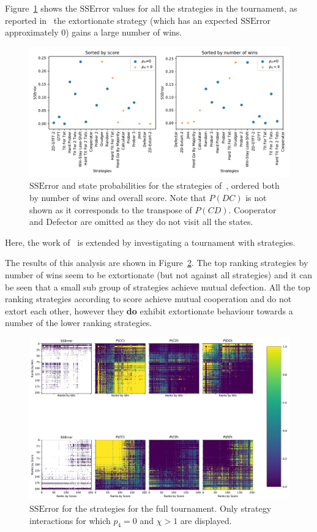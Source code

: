 \documentclass[a4paper]{article}
\begin{document}
Figure~\ref{fig:SSError_overall_in_stewart_plotkin} shows the \(\text{SSError}\)
values for all the strategies in the tournament, as reported
in~\cite{Stewart2012} the extortionate strategy (which has an expected
\(\text{SSError}\) approximately 0) gains a large number of wins.

\begin{figure}[!htbp]
    \centering
    \includegraphics[width=.8\textwidth]{./assets/img/SSError_overall_in_stewart_plotkin/main.pdf}
    \caption{\(\text{SSError}\) and state probabilities for the strategies
        of~\cite{Stewart2012}, ordered both by number of wins and overall score.
        Note that \(P(DC)\) is not shown as it corresponds to the transpose of
        \(P(CD)\). Cooperator and Defector are omitted as they do not visit all
        the states.}
    \label{fig:SSError_overall_in_stewart_plotkin}
\end{figure}

Here, the work of~\cite{Stewart2012} is extended by investigating a tournament
with 
strategies.

The results of this analysis are shown in
Figure~\ref{fig:SSError_and_probabilities_in_full}. The top ranking strategies
by number of wins seem to be extortionate (but not against all strategies) and
it can be seen that a small sub group of strategies achieve mutual defection.
All the top ranking strategies according to score achieve mutual cooperation and
do not extort each other, however they
\textbf{do} exhibit extortionate behaviour towards a number of the lower ranking
strategies.

\begin{figure}[!htbp]
    \centering
    \includegraphics[width=.8\textwidth]{./assets/img/SSError_and_probabilities_in_full/main.pdf}
    \caption{\(\text{SSError}\) for the strategies for the full tournament. Only
    strategy interactions for which \(p_4=0\) and \(\chi>1\) are displayed.}
    \label{fig:SSError_and_probabilities_in_full}
\end{figure}
\end{document}
